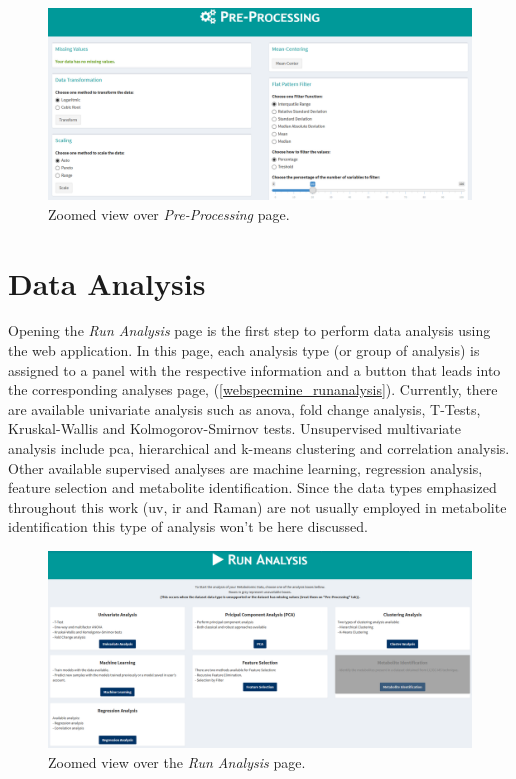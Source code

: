 \begin{figure}[h]
	\centering
	\includegraphics[width=1\linewidth]{Imagens/webspecmine_preprocessing}
	\caption{Zoomed view over \textit{Pre-Processing} page.}
	\label{webspecmine_preprocessing}
\end{figure}



\section{Data Analysis}

Opening the \textit{Run Analysis} page is the first step to perform data analysis using the web application. In this page, each analysis type (or group of analysis) is assigned to a panel with the respective information and a button that leads into the corresponding analyses page, (\autoref{webspecmine_runanalysis}). Currently, there are available univariate analysis such as \gls{anova}, fold change analysis, T-Tests, Kruskal-Wallis and Kolmogorov-Smirnov tests. Unsupervised multivariate analysis include \gls{pca}, hierarchical and k-means clustering and correlation analysis. Other available supervised analyses are machine learning, regression analysis, feature selection and metabolite identification. Since the data types emphasized throughout this work (\gls{uv}, \gls{ir} and Raman) are not usually employed in metabolite identification this type of analysis won't be here discussed. 

\begin{figure}[h]
	\centering
	\includegraphics[width=1\linewidth]{Imagens/webspecmine_runanalysis}
	\caption{Zoomed view over the \textit{Run Analysis} page.}
	\label{webspecmine_runanalysis}
\end{figure}

